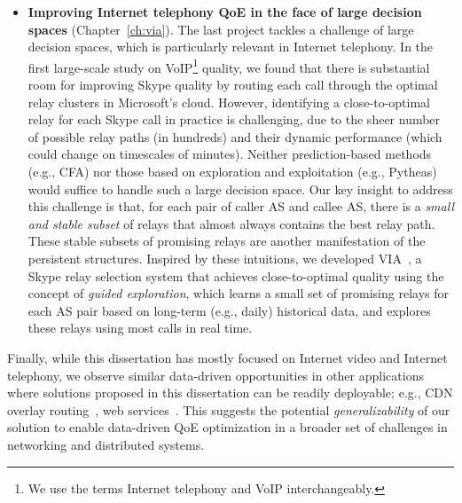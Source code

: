 \begin{itemize}
\item {\bf Improving Internet telephony QoE in the face of large decision spaces} 
(Chapter~\ref{ch:via}).
The last project tackles a challenge of large decision spaces, which 
is particularly relevant in Internet telephony.
In the first large-scale study on VoIP\footnote{We use the terms Internet telephony 
and VoIP interchangeably.} quality, we found that 
there is substantial room for improving Skype quality by routing each 
call through the optimal relay clusters in Microsoft's cloud.
However, identifying a close-to-optimal relay for each Skype call in practice 
is challenging, 
due to the sheer number of possible relay paths 
(in hundreds) and their dynamic performance (which could change 
on timescales of minutes). Neither prediction-based methods (e.g., 
CFA) nor those based on 
exploration and exploitation (e.g., Pytheas) would suffice to handle such a 
large decision space.
Our key insight to address this challenge is that, for each pair of caller 
AS and callee AS, there is a {\em small and stable subset} of relays that 
almost always contains the best relay path. These stable subsets of promising
relays are another manifestation of the persistent structures.
Inspired by these intuitions, we developed {VIA}~\cite{via}, 
a Skype relay selection system that achieves close-to-optimal quality 
using the concept of {\em guided exploration},
which learns a small set of promising relays for each 
AS pair based on long-term (e.g., daily) historical data, and 
explores these relays using most calls in real time.

\end{itemize}

%
Finally, while this dissertation has mostly focused on 
Internet video and Internet telephony, 
we observe similar data-driven opportunities in other applications
where solutions proposed in this dissertation can be readily 
deployable; e.g., CDN overlay routing~\cite{mukerjee2015practical}, 
web services~\cite{footprint}.
This suggests the potential {\em generalizability} of our solution to enable
data-driven QoE optimization in a broader set of challenges in 
networking and distributed systems.

